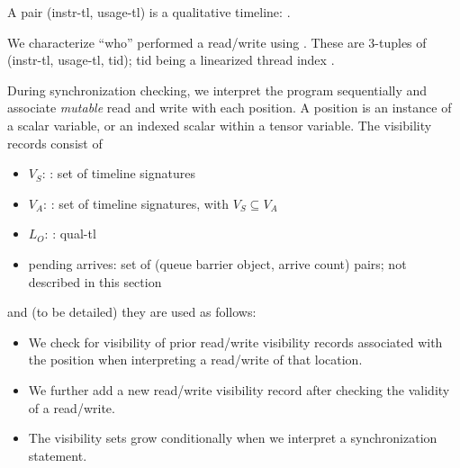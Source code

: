 \filbreak
{}

A pair (instr-tl, usage-tl) is a qualitative timeline: .

\filbreak
{}

We characterize ``who'' performed a read/write  using .
These are 3-tuples of (instr-tl, usage-tl, tid); tid being a linearized thread index .

\filbreak
{}

During synchronization checking, we interpret the program sequentially and associate \textit{mutable} read and write  with each position.
A position is an instance of a scalar variable, or an indexed scalar within a tensor variable.
The visibility records consist of
\begin{itemize}
  \item $V_S$: : set of timeline signatures
  \filbreak
  \item $V_A$: : set of timeline signatures, with $V_S \subseteq V_A$
  \filbreak
  \item $L_O$: : qual-tl
  \filbreak
  \item pending arrives: set of (queue barrier object, arrive count) pairs; not described in this section
\end{itemize}
\filbreak
and (to be detailed) they are used as follows:
\begin{itemize}
  \item We check for visibility of prior read/write visibility records associated with the position when interpreting a read/write of that location.
  \filbreak
  \item We further add a new read/write visibility record after checking the validity of a read/write.
  \filbreak
  \item The visibility sets grow conditionally when we interpret a synchronization statement.
\end{itemize}

\filbreak
{}

